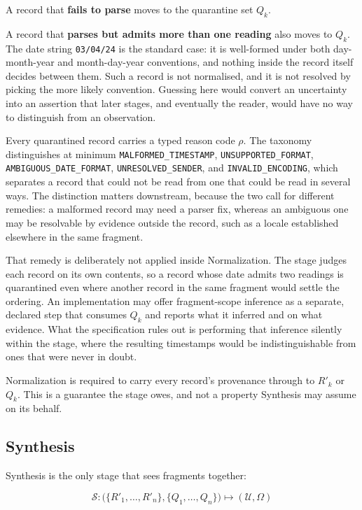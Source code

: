 A record that \textbf{fails to parse} moves to the quarantine set $Q_k$.

A record that \textbf{parses but admits more than one reading} also moves to
$Q_k$. The date string \texttt{03/04/24} is the standard case: it is well-formed
under both day-month-year and month-day-year conventions, and nothing inside the
record itself decides between them. Such a record is not normalised, and it is
not resolved by picking the more likely convention. Guessing here would convert
an uncertainty into an assertion that later stages, and eventually the reader,
would have no way to distinguish from an observation.

Every quarantined record carries a typed reason code $\rho$. The taxonomy
distinguishes at minimum \texttt{MALFORMED\_\allowbreak TIMESTAMP},
\texttt{UNSUPPORTED\_\allowbreak FORMAT}, \texttt{AMBIGUOUS\_\allowbreak DATE\_\allowbreak FORMAT},
\texttt{UNRESOLVED\_\allowbreak SENDER}, and \texttt{INVALID\_\allowbreak ENCODING}, which separates a
record that could not be read from one that could be read in several ways. The
distinction matters downstream, because the two call for different remedies: a
malformed record may need a parser fix, whereas an ambiguous one may be resolvable
by evidence outside the record, such as a locale established elsewhere in the same
fragment.

That remedy is deliberately not applied inside Normalization. The stage judges
each record on its own contents, so a record whose date admits two readings is
quarantined even where another record in the same fragment would settle the
ordering. An implementation may offer fragment-scope inference as a separate,
declared step that consumes $Q_k$ and reports what it inferred and on what
evidence. What the specification rules out is performing that inference silently
within the stage, where the resulting timestamps would be indistinguishable from
ones that were never in doubt.

Normalization is required to carry every record's provenance through to $R'_k$ or
$Q_k$. This is a guarantee the stage owes, and not a property Synthesis may assume
on its behalf.

\subsection{Synthesis}
\label{sec:carta:synthesis}

Synthesis is the only stage that sees fragments together:

\begin{equation}
  \mathcal{S}: \big(\{R'_1, \dots, R'_n\}, \{Q_1, \dots, Q_n\}\big)
  \mapsto (\mathcal{U}, \Omega)
\end{equation}

